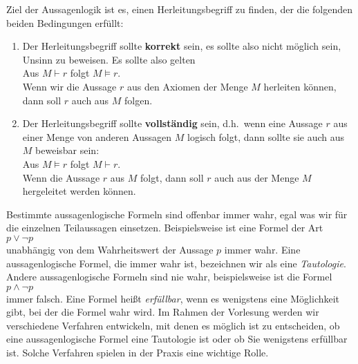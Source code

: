 Ziel der Aussagenlogik ist es, einen
Herleitungsbegriff zu finden, der die folgenden beiden Bedingungen erf\"{u}llt:
\begin{enumerate}
\item Der Herleitungsbegriff sollte {\bf korrekt} sein, es sollte also nicht m\"{o}glich sein,
      Unsinn zu beweisen.  Es sollte also gelten \\[0.2cm]
      \hspace*{1.3cm} Aus $M \vdash r$ folgt $M \models r$. 
      \\[0.2cm]
      Wenn wir die Aussage $r$ aus den Axiomen der Menge $M$ herleiten k\"{o}nnen, dann 
      soll $r$ auch aus $M$ folgen.
\item Der Herleitungsbegriff sollte {\bf vollst\"{a}ndig} sein, d.h.~wenn eine Aussage $r$
      aus einer Menge von anderen Aussagen $M$ logisch folgt, dann sollte sie
      auch aus $M$ beweisbar sein: \\[0.2cm]
      \hspace*{1.3cm} Aus $M \models r$ folgt $M \vdash r$. 
      \\[0.2cm]
      Wenn die Aussage $r$ aus $M$ folgt, dann soll $r$ auch aus der Menge $M$
      hergeleitet werden k\"{o}nnen.
\end{enumerate}

Bestimmte aussagenlogische Formeln sind offenbar immer wahr, egal was
 wir f\"{u}r die einzelnen Teilaussagen einsetzen.  Beispielsweise ist eine Formel der Art
\\[0.2cm]
\hspace*{1.3cm}
$p \vee \neg p$
\\[0.2cm]
unabh\"{a}ngig von dem Wahrheitswert der Aussage $p$ immer wahr.  Eine aussagenlogische
Formel, die immer wahr ist, bezeichnen wir als eine \emph{Tautologie}.  Andere
aussagenlogische Formeln sind nie wahr, beispielsweise ist die Formel
\\[0.2cm]
\hspace*{1.3cm}
$p \wedge \neg p$
\\[0.2cm]
immer falsch.  Eine Formel hei\ss{}t \emph{erf\"{u}llbar}, wenn es wenigstens eine M\"{o}glichkeit
gibt, bei der die Formel wahr wird.  Im Rahmen der Vorlesung werden wir verschiedene Verfahren
entwickeln, mit denen es m\"{o}glich ist zu entscheiden, ob eine aussagenlogische Formel eine
Tautologie ist oder ob Sie wenigstens erf\"{u}llbar ist.  Solche Verfahren spielen
in der Praxis eine wichtige Rolle.

